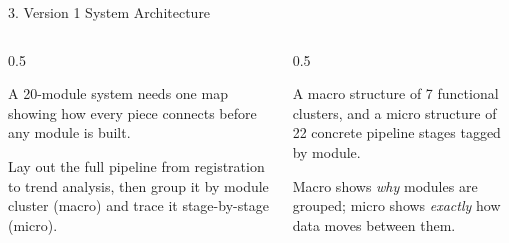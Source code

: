 \documentclass[9pt,aspectratio=169]{beamer}
\begin{document}
\begin{frame}{3. Version 1 System Architecture}
\begin{columns}[T,onlytextwidth]
\begin{column}{0.5\textwidth}
\begin{tcolorbox}[colback=blue!7,colframe=blue!55!black,title=\textbf{Motivation},boxrule=0.6pt,arc=1mm,left=5pt,right=5pt,top=3pt,bottom=3pt,fonttitle=\small]
\footnotesize A 20-module system needs one map showing how every piece connects before any module is built.
\end{tcolorbox}
\vspace{5pt}
\begin{tcolorbox}[colback=teal!7,colframe=teal!55!black,title=\textbf{Method},boxrule=0.6pt,arc=1mm,left=5pt,right=5pt,top=3pt,bottom=3pt,fonttitle=\small]
\footnotesize Lay out the full pipeline from registration to trend analysis, then group it by module cluster (macro) and trace it stage-by-stage (micro).
\end{tcolorbox}
\end{column}
\begin{column}{0.5\textwidth}
\begin{tcolorbox}[colback=green!8,colframe=green!45!black,title=\textbf{Result},boxrule=0.6pt,arc=1mm,left=5pt,right=5pt,top=3pt,bottom=3pt,fonttitle=\small]
\footnotesize A macro structure of 7 functional clusters, and a micro structure of 22 concrete pipeline stages tagged by module.
\end{tcolorbox}
\vspace{5pt}
\begin{tcolorbox}[colback=orange!10,colframe=orange!65!black,title=\textbf{Conclusion},boxrule=0.6pt,arc=1mm,left=5pt,right=5pt,top=3pt,bottom=3pt,fonttitle=\small]
\footnotesize Macro shows \textit{why} modules are grouped; micro shows \textit{exactly} how data moves between them.
\end{tcolorbox}
\end{column}
\end{columns}
\end{frame}
\end{document}

